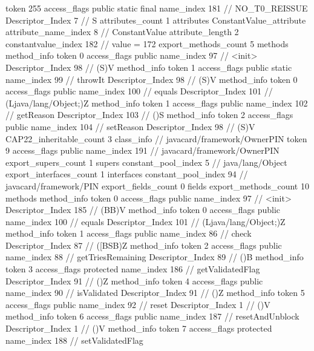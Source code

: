 {{{{{				token	255
				access_flags	public static final
				name_index	181		// NO_T0_REISSUE
				Descriptor_Index	7		// S
				attributes_count	1
				attributes {
				ConstantValue_attribute {
					attribute_name_index	8		// ConstantValue
					attribute_length	2
					constantvalue_index	182		// value = 172
				}
				}
			}
			}
			export_methods_count	5
			methods {
				method_info {
					token	0
					access_flags	public
					name_index	97		// <init>
					Descriptor_Index	98		// (S)V
				}
				method_info {
					token	1
					access_flags	public static
					name_index	99		// throwIt
					Descriptor_Index	98		// (S)V
				}
				method_info {
					token	0
					access_flags	public
					name_index	100		// equals
					Descriptor_Index	101		// (Ljava/lang/Object;)Z
				}
				method_info {
					token	1
					access_flags	public
					name_index	102		// getReason
					Descriptor_Index	103		// ()S
				}
				method_info {
					token	2
					access_flags	public
					name_index	104		// setReason
					Descriptor_Index	98		// (S)V
				}
			}
			CAP22_inheritable_count	3
		}
		class_info {		// javacard/framework/OwnerPIN
			token	9
			access_flags	public
			name_index	191		// javacard/framework/OwnerPIN
			export_supers_count	1
			supers {
				constant_pool_index	5		// java/lang/Object
			}
			export_interfaces_count	1
			interfaces {
				constant_pool_index	94		// javacard/framework/PIN
			}
			export_fields_count	0
			fields {
			}
			export_methods_count	10
			methods {
				method_info {
					token	0
					access_flags	public
					name_index	97		// <init>
					Descriptor_Index	185		// (BB)V
				}
				method_info {
					token	0
					access_flags	public
					name_index	100		// equals
					Descriptor_Index	101		// (Ljava/lang/Object;)Z
				}
				method_info {
					token	1
					access_flags	public
					name_index	86		// check
					Descriptor_Index	87		// ([BSB)Z
				}
				method_info {
					token	2
					access_flags	public
					name_index	88		// getTriesRemaining
					Descriptor_Index	89		// ()B
				}
				method_info {
					token	3
					access_flags	protected
					name_index	186		// getValidatedFlag
					Descriptor_Index	91		// ()Z
				}
				method_info {
					token	4
					access_flags	public
					name_index	90		// isValidated
					Descriptor_Index	91		// ()Z
				}
				method_info {
					token	5
					access_flags	public
					name_index	92		// reset
					Descriptor_Index	1		// ()V
				}
				method_info {
					token	6
					access_flags	public
					name_index	187		// resetAndUnblock
					Descriptor_Index	1		// ()V
				}
				method_info {
					token	7
					access_flags	protected
					name_index	188		// setValidatedFlag
}}}}}
